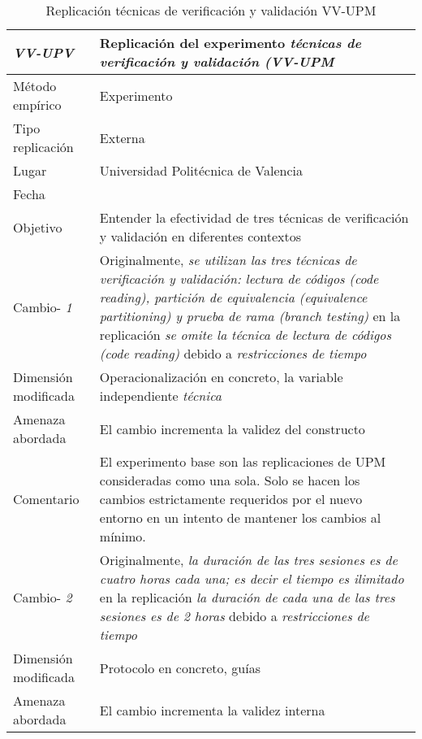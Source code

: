 
\begin{table}
\caption{Replicación técnicas de verificación y validación VV-UPM}
\begin{tabular}{| p{3.3cm} | p{9cm} |}
\hline

\textbf {\textit{VV-UPV}} & Replicación del experimento \textit{técnicas de verificación y validación (VV-UPM }    \\  \hline

Método empírico &  Experimento   \\  \hline
Tipo replicación &  Externa   \\  \hline
Lugar & Universidad Politécnica de Valencia  \\  \hline
Fecha &     \\  \hline
Objetivo  &  Entender la efectividad de tres técnicas de verificación y validación en diferentes contextos \\  \hline \hline
 
Cambio- \textit{1}   & \parbox[t]{9cm} {Originalmente,  \textit{ se utilizan las tres técnicas de verificación y validación: lectura de códigos (code reading), partición de equivalencia (equivalence partitioning) y prueba de rama (branch testing) } } \parbox[t]{9cm}{en la replicación \textit{ se omite la técnica de lectura de códigos (code reading)  } }  debido a  \textit{restricciones de tiempo } \\  \hline
Dimensión modificada & 
Operacionalización en concreto, la variable independiente \textit {técnica} \\  \hline 
Amenaza abordada  & El cambio incrementa la validez del constructo  \\  \hline
Comentario  &  El experimento base son las replicaciones de UPM consideradas como una sola. Solo se hacen los cambios estrictamente requeridos por el nuevo entorno en un intento de mantener los cambios al mínimo. \\  \hline \hline

Cambio- \textit{2}   & \parbox[t]{9cm} {Originalmente,  \textit{ la duración de las tres sesiones es de cuatro horas cada una; es decir el tiempo es ilimitado } } \parbox[t]{9cm}{en la replicación \textit{ la duración de cada una de las tres sesiones es de 2 horas  } }  debido a  \textit{restricciones de tiempo } \\  \hline
Dimensión modificada & 
Protocolo en concreto, guías  \\  \hline 
Amenaza abordada  & El cambio incrementa la validez interna  \\  \hline
 \hline


\end{tabular}
\end{table}
